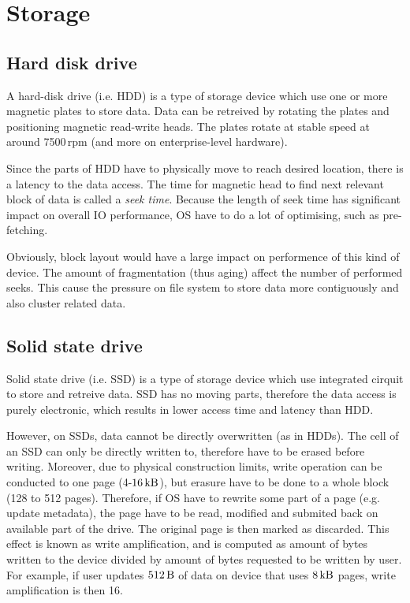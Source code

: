 \documentclass[
  color, %
  table, %
  lof,   %
  lot,   %
]{fithesis3}
\begin{document}
\section{Storage}
\subsection{Hard disk drive}
A hard-disk drive (i.e. HDD) is a type of storage device which use one or more magnetic plates to store data. Data can be retreived by rotating the plates and positioning magnetic read-write heads. The plates rotate at stable speed at around 7500\,rpm (and more on enterprise-level hardware).

Since the parts of HDD have to physically move to reach desired location, there is a latency to the data access. The time for magnetic head to find next relevant block of data is called a \emph{seek time}. Because the length of seek time has significant impact on overall IO performance, OS have to do a lot of optimising, such as pre-fetching.

Obviously, block layout would have a large impact on performence of this kind of device. The amount of fragmentation (thus aging) affect the number of performed seeks. This cause the pressure on file system to store data more contiguously and also cluster related data.

\subsection{Solid state drive}
Solid state drive (i.e. SSD) is  a type of storage device which use integrated cirquit to store and retreive data. SSD has no moving parts, therefore the data access is purely electronic, which results in lower access time and latency than HDD.

However, on SSDs, data cannot be directly overwritten (as in HDDs). The cell of an SSD can only be directly written to, therefore have to be erased before writing. Moreover, due to physical construction limits, write operation can be conducted to one page (4-$\SI{16}{\kilo\byte}$), but erasure have to be done to a whole block (128 to 512 pages). Therefore, if OS have to rewrite some part of a page (e.g. update metadata), the page have to be read, modified and submited back on available part of the drive. The original page is then marked as discarded. This effect is known as write amplification, and is computed as amount of bytes written to the device divided by amount of bytes requested to be written by user. For example, if user updates $\SI{512}{\byte}$ of data on device that uses $\SI{8}{\kilo\byte}$ pages, write amplification is then 16.
\end{document}
